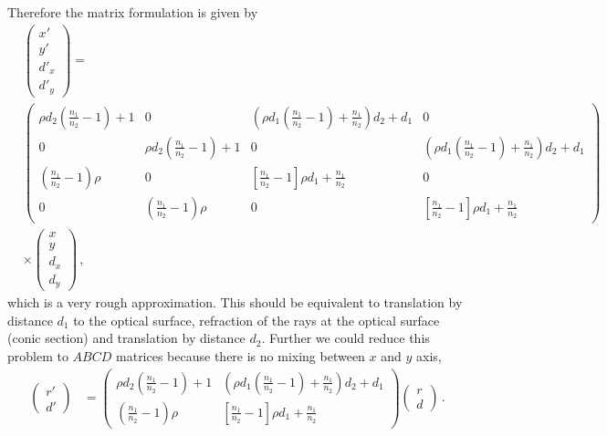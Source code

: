 \documentclass[12pt,a4paper,twoside,openright,BCOR10mm,headsepline,titlepage,abstracton,chapterprefix,final]{scrreprt}
\begin{document}
Therefore the matrix formulation is given by
\begin{align}
 &\begin{pmatrix} x' \\ y' \\ {d'}_x \\ {d'}_y \end{pmatrix} =\nonumber\\ 
 &\begin{pmatrix} \rho d_{2} {\left(\frac{n_{1}}{n_{2}} - 1\right)} + 1 & 0 & {\left(\rho d_{1} \left(\frac{n_{1}}{n_{2}} - 1\right) + \frac{n_{1}}{n_{2}}\right)} d_{2} + d_{1} & 0 \\ 
		  0 & \rho d_{2} {\left(\frac{n_{1}}{n_{2}} - 1\right)} + 1 & 0 & {\left(\rho d_{1} \left(\frac{n_{1}}{n_{2}} - 1\right) + \frac{n_{1}}{n_{2}}\right)} d_{2} + d_{1} \\ 
		  \left(\frac{n_{1}}{n_{2}} - 1\right) \rho & 0 & \left[\frac{n_{1}}{n_{2}} - 1\right]\rho d_1 + \frac{n_{1}}{n_{2}} & 0 \\ 
		  0 & \left(\frac{n_{1}}{n_{2}} - 1\right) \rho & 0 & \left[\frac{n_{1}}{n_{2}} - 1\right]\rho d_1 + \frac{n_{1}}{n_{2}}\end{pmatrix}\nonumber\\ 
 &\times\begin{pmatrix} x \\ y \\ d_x \\ d_y \end{pmatrix}\,,
\end{align}
which is a very rough approximation.
This should be equivalent to translation by distance $d_1$ to the optical surface,
refraction of the rays at the optical surface (conic section) and translation by distance
$d_2$. Further we could reduce this problem to $ABCD$ matrices because there is no mixing
between $x$ and $y$ axis,
\begin{align}
 \begin{pmatrix} r'  \\ d' \end{pmatrix} &= 
 \begin{pmatrix} \rho d_{2} {\left(\frac{n_{1}}{n_{2}} - 1\right)} + 1 & {\left(\rho d_{1} \left(\frac{n_{1}}{n_{2}} - 1\right) + \frac{n_{1}}{n_{2}}\right)} d_{2} + d_{1} \\ 
		\left(\frac{n_{1}}{n_{2}} - 1\right) \rho &  \left[\frac{n_{1}}{n_{2}} - 1\right]\rho d_1 + \frac{n_{1}}{n_{2}} \end{pmatrix}
 \begin{pmatrix} r  \\ d \end{pmatrix}\,.
\end{align}
\end{document}

